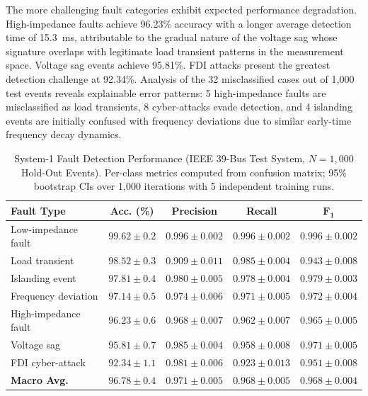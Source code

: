 \documentclass[journal]{IEEEtran}
\begin{document}
The more challenging fault categories exhibit expected performance degradation. High-impedance faults achieve 96.23\% accuracy with a longer average detection time of 15.3~ms, attributable to the gradual nature of the voltage sag whose signature overlaps with legitimate load transient patterns in the measurement space. Voltage sag events achieve 95.81\%. FDI attacks present the greatest detection challenge at 92.34\%. Analysis of the 32 misclassified cases out of 1,000 test events reveals explainable error patterns: 5 high-impedance faults are misclassified as load transients, 8 cyber-attacks evade detection, and 4 islanding events are initially confused with frequency deviations due to similar early-time frequency decay dynamics.

\begin{table}[!t]
\centering
\caption{System-1 Fault Detection Performance (IEEE 39-Bus Test System, $N=1,000$ Hold-Out Events). Per-class metrics computed from confusion matrix; 95\% bootstrap CIs over 1,000 iterations with 5 independent training runs.}
\label{tab:accuracy}
\begin{tabular}{lcccc}
\toprule
\textbf{Fault Type} & \textbf{Acc. (\%)} & \textbf{Precision} & \textbf{Recall} & $\mathbf{F_1}$ \\
\midrule
Low-impedance fault & $99.62 \pm 0.2$ & $0.996 \pm 0.002$ & $0.996 \pm 0.002$ & $0.996 \pm 0.002$ \\
Load transient       & $98.52 \pm 0.3$ & $0.909 \pm 0.011$ & $0.985 \pm 0.004$ & $0.943 \pm 0.008$ \\
Islanding event      & $97.81 \pm 0.4$ & $0.980 \pm 0.005$ & $0.978 \pm 0.004$ & $0.979 \pm 0.003$ \\
Frequency deviation  & $97.14 \pm 0.5$ & $0.974 \pm 0.006$ & $0.971 \pm 0.005$ & $0.972 \pm 0.004$ \\
High-impedance fault & $96.23 \pm 0.6$ & $0.968 \pm 0.007$ & $0.962 \pm 0.007$ & $0.965 \pm 0.005$ \\
Voltage sag          & $95.81 \pm 0.7$ & $0.985 \pm 0.004$ & $0.958 \pm 0.008$ & $0.971 \pm 0.005$ \\
FDI cyber-attack     & $92.34 \pm 1.1$ & $0.981 \pm 0.006$ & $0.923 \pm 0.013$ & $0.951 \pm 0.008$ \\
\midrule
\textbf{Macro Avg.}  & $\mathbf{96.78 \pm 0.4}$ & $\mathbf{0.971 \pm 0.005}$ & $\mathbf{0.968 \pm 0.005}$ & $\mathbf{0.968 \pm 0.004}$ \\
\bottomrule
\end{tabular}
\end{table}
\end{document}
